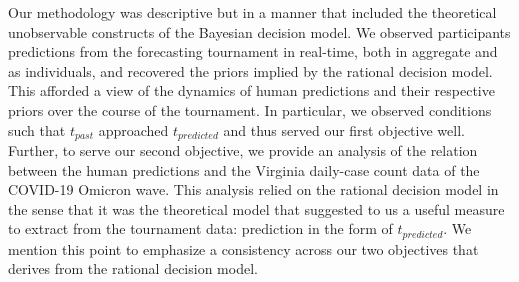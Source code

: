 \documentclass[a4paper,man,natbib]{apa6}
\begin{document}
Our methodology was descriptive but in a manner that included the theoretical unobservable constructs of the Bayesian decision model.  We observed participants predictions from the forecasting tournament in real-time, both in aggregate and as individuals, and recovered the priors implied by the rational decision model.  This afforded a view of the dynamics of human predictions and their respective priors over the course of the tournament.  In particular, we observed conditions such that $t_{past}$ approached $t_{predicted}$ and thus served our first objective well.  Further, to serve our second objective, we provide an analysis of the relation between the human predictions and the Virginia daily-case count data of the COVID-19 Omicron wave.  This analysis relied on the rational decision model in the sense that it was the theoretical model that suggested to us a useful measure to extract from the tournament data: prediction in the form of $t_{predicted}$.  We mention this point to emphasize a consistency across our two objectives that derives from the rational decision model. 
\end{document}

